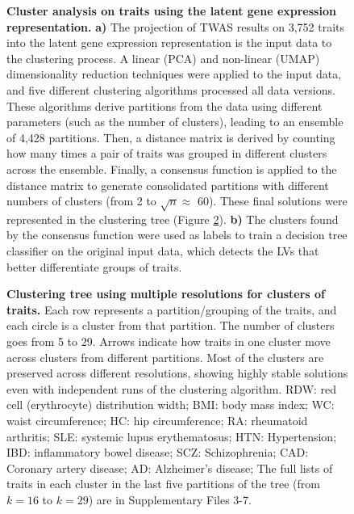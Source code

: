 \documentclass[
  a4paper,
]{article}
\begin{document}
\begin{figure}
\hypertarget{fig:clustering:design}{%
\centering
% 
\caption{\textbf{Cluster analysis on traits using the latent gene expression representation.}
\textbf{a)} The projection of TWAS results on 3,752 traits into the latent gene expression representation is the input data to the clustering process.
A linear (PCA) and non-linear (UMAP) dimensionality reduction techniques were applied to the input data, and five different clustering algorithms processed all data versions.
These algorithms derive partitions from the data using different parameters (such as the number of clusters), leading to an ensemble of 4,428 partitions.
Then, a distance matrix is derived by counting how many times a pair of traits was grouped in different clusters across the ensemble.
Finally, a consensus function is applied to the distance matrix to generate consolidated partitions with different numbers of clusters (from 2 to \(\sqrt{n}\approx\) 60).
These final solutions were represented in the clustering tree (Figure \ref{fig:clustering:tree}).
\textbf{b)} The clusters found by the consensus function were used as labels to train a decision tree classifier on the original input data, which detects the LVs that better differentiate groups of traits.}\label{fig:clustering:design}
}
\end{figure}

\begin{figure}
\hypertarget{fig:clustering:tree}{%
\centering
% 
\caption{\textbf{Clustering tree using multiple resolutions for clusters of traits.}
Each row represents a partition/grouping of the traits, and each circle is a cluster from that partition.
The number of clusters goes from 5 to 29.
Arrows indicate how traits in one cluster move across clusters from different partitions.
Most of the clusters are preserved across different resolutions, showing highly stable solutions even with independent runs of the clustering algorithm.
RDW: red cell (erythrocyte) distribution width;
BMI: body mass index;
WC: waist circumference;
HC: hip circumference;
RA: rheumatoid arthritis;
SLE: systemic lupus erythematosus;
HTN: Hypertension;
IBD: inflammatory bowel disease;
SCZ: Schizophrenia;
CAD: Coronary artery disease;
AD: Alzheimer's disease;
The full lists of traits in each cluster in the last five partitions of the tree (from \(k=16\) to \(k=29\)) are in Supplementary Files 3-7.}\label{fig:clustering:tree}
}
\end{figure}
\end{document}
